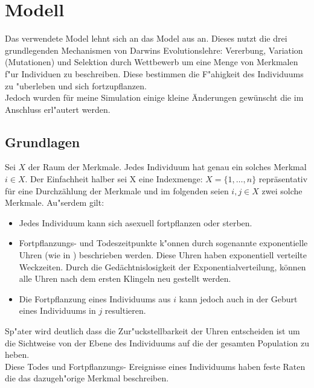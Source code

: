 \documentclass[11pt, a4paper, german]{article}
\begin{document}

\section{Modell}
Das verwendete Model lehnt sich an das Model aus \cite{Champagnat20061127} an. Dieses nutzt die drei grundlegenden Mechanismen von Darwins Evolutionslehre: Vererbung, Variation (Mutationen) und Selektion durch Wettbewerb um eine Menge von Merkmalen f"ur Individuen zu beschreiben. Diese bestimmen die F"ahigkeit des Individuums zu "uberleben und sich fortzupflanzen.\\
Jedoch wurden für meine Simulation einige kleine Änderungen gewünscht die im Anschluss erl"autert werden. \\
	\subsection{Grundlagen}
	Sei $ X $ der Raum der Merkmale. Jedes Individuum hat genau ein solches Merkmal $ i \in X $. Der Einfachheit halber sei X eine Indexmenge: $ X = \{1,\dots, n\} $ repräsentativ für eine Durchzählung der Merkmale und im folgenden seien $ i,j \in X $ zwei solche Merkmale. Au"serdem gilt:
	\begin{itemize}
		\item Jedes Individuum kann sich asexuell fortpflanzen oder sterben.
		\item Fortpflanzungs- und Todeszeitpunkte k"onnen durch sogenannte exponentielle Uhren (wie in \cite[S. 3]{fournier2004microscopic}) beschrieben werden. Diese Uhren haben exponentiell verteilte Weckzeiten. Durch die Gedächtnislosigkeit der Exponentialverteilung, können alle Uhren nach dem ersten Klingeln neu gestellt werden. 
		\item Die Fortpflanzung eines Individuums aus $ i $ kann jedoch auch in der Geburt eines Individuums in $ j $ resultieren.
	\end{itemize}
	Sp"ater wird deutlich dass die Zur"uckstellbarkeit der Uhren entscheiden ist um die Sichtweise von der Ebene des Individuums auf die der gesamten Population zu heben.\\
	Diese Todes und Fortpflanzungs- Ereignisse eines Individuums haben feste Raten die das dazugeh"orige Merkmal beschreiben.\\
	
\end{document}
